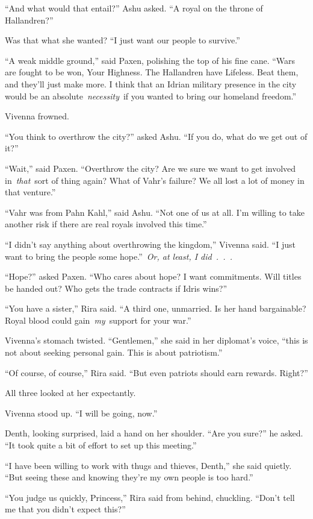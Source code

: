 “And what would that entail?” Ashu asked. “A royal on the throne of Hallandren?”

Was that what she wanted? “I just want our people to survive.”

“A weak middle ground,” said Paxen, polishing the top of his fine cane. “Wars are fought to be won, Your Highness. The Hallandren have Lifeless. Beat them, and they’ll just make more. I think that an Idrian military presence in the city would be an absolute~\textit{necessity}~if you wanted to bring our homeland freedom.”

Vivenna frowned.

“You think to overthrow the city?” asked Ashu. “If you do, what do we get out of it?”

“Wait,” said Paxen. “Overthrow the city? Are we sure we want to get involved in~\textit{that}~sort of thing again? What of Vahr’s failure? We all lost a lot of money in that venture.”

“Vahr was from Pahn Kahl,” said Ashu. “Not one of us at all. I’m willing to take another risk if there are real royals involved this time.”

“I didn’t say anything about overthrowing the kingdom,” Vivenna said. “I just want to bring the people some hope.”~\textit{Or, at least, I did~.~.~.}

“Hope?” asked Paxen. “Who cares about hope? I want commitments. Will titles be handed out? Who gets the trade contracts if Idris wins?”

“You have a sister,” Rira said. “A third one, unmarried. Is her hand bargainable? Royal blood could gain~\textit{my}~support for your war.”

Vivenna’s stomach twisted. “Gentlemen,” she said in her diplomat’s voice, “this is not about seeking personal gain. This is about patriotism.”

“Of course, of course,” Rira said. “But even patriots should earn rewards. Right?”

All three looked at her expectantly.

Vivenna stood up. “I will be going, now.”

Denth, looking surprised, laid a hand on her shoulder. “Are you sure?” he asked. “It took quite a bit of effort to set up this meeting.”

“I have been willing to work with thugs and thieves, Denth,” she said quietly. “But seeing these and knowing they’re my own people is too hard.”

“You judge us quickly, Princess,” Rira said from behind, chuckling. “Don’t tell me that you didn’t expect this?”

